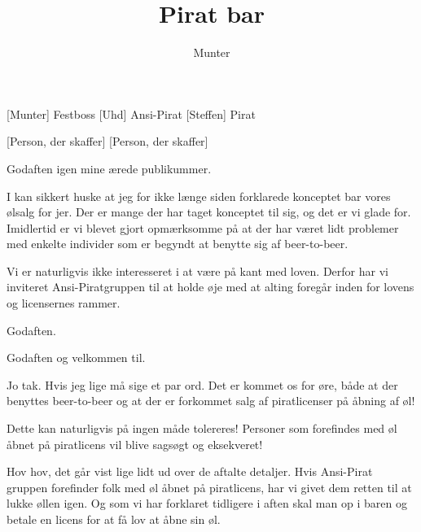 \documentclass[a4paper,11pt]{article}
\title{Pirat bar}
\author{Munter}
\begin{document}
\maketitle

\begin{roles}
[Munter] Festboss
[Uhd] Ansi-Pirat
[Steffen] Pirat
\end{roles}

\begin{props}
[Person, der skaffer]
[Person, der skaffer]
\end{props}

  
\begin{sketch}


 Godaften igen mine ærede publikummer.

 I kan sikkert huske at jeg for ikke længe siden forklarede konceptet bar vores ølsalg for jer.
         Der er mange der har taget konceptet til sig, og det er vi glade for.
         Imidlertid er vi blevet gjort opmærksomme på at der har været lidt problemer med enkelte individer
         som er begyndt at benytte sig af beer-to-beer.

 Vi er naturligvis ikke interesseret i at være på kant med loven. Derfor har vi inviteret Ansi-Piratgruppen
         til at holde øje med at alting foregår inden for lovens og licensernes rammer.

  Godaften.

 Godaften og velkommen til.

 Jo tak. Hvis jeg lige må sige et par ord. 
         Det er kommet os for øre, både at der benyttes beer-to-beer og at der er forkommet salg
         af piratlicenser på åbning af øl!

 Dette kan naturligvis på ingen måde tolereres! Personer som forefindes med øl åbnet på
         piratlicens vil blive sagsøgt og eksekveret!

 Hov hov, det går vist lige lidt ud over de aftalte detaljer.
         Hvis Ansi-Pirat gruppen forefinder folk med øl åbnet på piratlicens, har vi givet
         dem retten til at lukke øllen igen. Og som vi har forklaret tidligere i aften
         skal man op i baren og betale en licens for at få lov at åbne sin øl.


\end{sketch}
\end{document}

